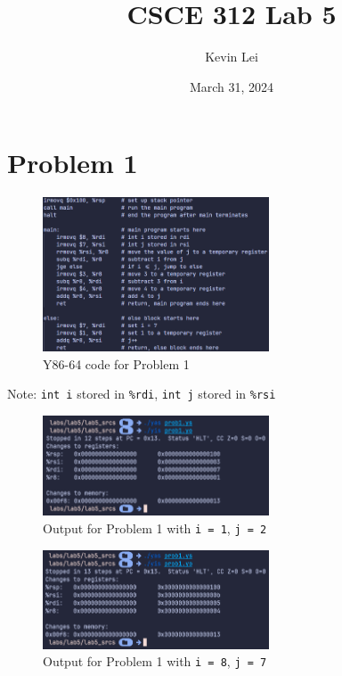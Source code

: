 \documentclass{article}
\title{CSCE 312 Lab 5}
\author{Kevin Lei}
\date{March 31, 2024}
\begin{document}
\maketitle

\section*{Problem 1}

\begin{figure}[H]
    \centering
    \includegraphics[width=0.6\textwidth]{../images/prob1_code.png}
    \caption{Y86-64 code for Problem 1}
\end{figure}

Note: \texttt{int i} stored in \texttt{\%rdi}, \texttt{int j} stored in \texttt{\%rsi}

\begin{figure}[H]
    \centering
    \includegraphics[width=0.6\textwidth]{../images/prob1_out1.png}
    \caption{Output for Problem 1 with \texttt{i = 1}, \texttt{j = 2}}
\end{figure}

\begin{figure}[H]
    \centering
    \includegraphics[width=0.6\textwidth]{../images/prob1_out2.png}
    \caption{Output for Problem 1 with \texttt{i = 8}, \texttt{j = 7}}
\end{figure}
\end{document}
